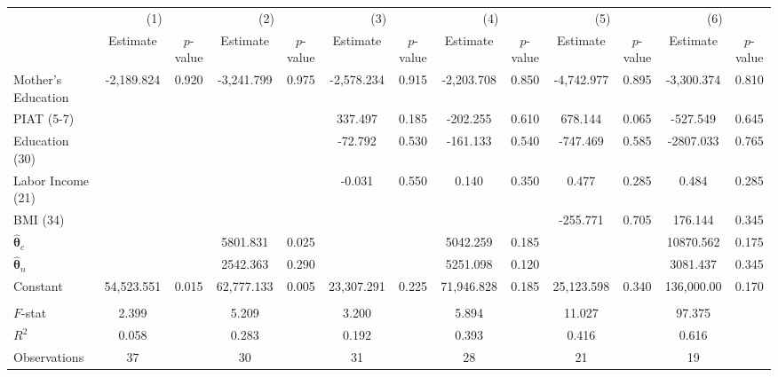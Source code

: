 \begin{tabular}{lcccccccccccc} \toprule
 & \multicolumn{2}{c}{(1)}  &  \multicolumn{2}{c}{(2)}  &  \multicolumn{2}{c}{(3)}  &  \multicolumn{2}{c}{(4)}  & \multicolumn{2}{c}{(5)} & \multicolumn{2}{c}{(6)} \\  
 & Estimate & $p$-value & Estimate & $p$-value & Estimate & $p$-value & Estimate & $p$-value & Estimate & $p$-value & Estimate & $p$-value \\ \midrule
Mother's Education & -2,189.824 &     0.920 & -3,241.799 &     0.975 & -2,578.234 &     0.915 & -2,203.708 &     0.850 & -4,742.977 &     0.895 & -3,300.374 &     0.810 \\  
PIAT (5-7)  &         &         &         &         &   337.497 &     0.185 &  -202.255 &     0.610 &   678.144 &     0.065 &  -527.549 &     0.645 \\  
Education (30) &         &         &         &         &   -72.792 &     0.530 &  -161.133 &     0.540 &  -747.469 &     0.585 & -2807.033 &     0.765 \\  
Labor Income (21)  &         &         &         &         &    -0.031 &     0.550 &     0.140 &     0.350 &     0.477 &     0.285 &     0.484 &     0.285 \\  
BMI (34)  &         &         &         &         &         &         &         &         &  -255.771 &     0.705 &   176.144 &     0.345 \\  
$\hat{\bm{\theta}}_c$  &         &         &  5801.831 &     0.025 &         &         &  5042.259 &     0.185 &         &         & 10870.562 &     0.175 \\  
$\hat{\bm{\theta}}_n$ &         &         &  2542.363 &     0.290 &         &         &  5251.098 &     0.120 &         &         &  3081.437 &     0.345 \\  
Constant & 54,523.551 &     0.015 & 62,777.133 &     0.005 & 23,307.291 &     0.225 & 71,946.828 &     0.185 & 25,123.598 &     0.340 &  136,000.00 &     0.170 \\  \\ \midrule
$F$-stat &     2.399 &     &     5.209 &   &     3.200 &     &     5.894 &      &    11.027 &      &    97.375 &     \\  
$R^2$ &     0.058 &      &     0.283 &      &     0.192 &     &     0.393 &     &     0.416 &     &     0.616 &      \\  
Observations &    37 &     &    30 &     &    31 &      &    28 &     &    21 &    &    19 &      \\  
\bottomrule\end{tabular}
